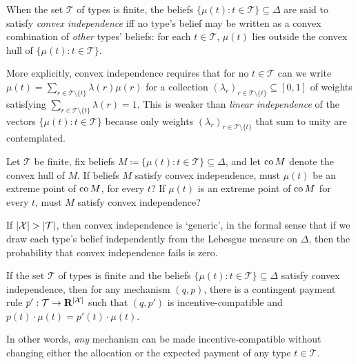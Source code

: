 \begin{definition}
	\label{definition:convex_indep}
	When the set $\mathcal{T}$ of types is finite,
	the beliefs $\{ \mu(t) : t \in \mathcal{T} \} \subseteq \Delta$
	are said to satisfy \emph{convex independence}
	iff no type's belief may be written as a convex combination of \emph{other} types' beliefs:
	for each $t \in \mathcal{T}$, $\mu(t)$ lies outside the convex hull of $\{ \mu(t) : t \in \mathcal{T} \}$.
\end{definition}

More explicitly, convex independence requires that
for no $t \in \mathcal{T}$
can we write $\mu(t) = \sum_{r \in \mathcal{T} \setminus \{t\}} \lambda(r) \mu(r)$
for a collection $( \lambda_r )_{r \in \mathcal{T} \setminus \{t\}} \subseteq [0,1]$ of weights satisfying $\sum_{r \in \mathcal{T} \setminus \{t\}} \lambda(r) = 1$.
This is weaker than \emph{linear independence} of the vectors $\{ \mu(t) : t \in \mathcal{T} \}$ because only weights $( \lambda_r )_{r \in \mathcal{T} \setminus \{t\}}$ that sum to unity are contemplated.

\begin{exercise}
	\label{exercise:convex_indep_ext_point}
	Let $\mathcal{T}$ be finite,
	fix beliefs $M \coloneqq \{ \mu(t) : t \in \mathcal{T} \} \subseteq \Delta$,
	and let $\operatorname*{co} M$ denote the convex hull of $M$.
	If beliefs $M$ satisfy convex independence, must $\mu(t)$ be an extreme point of $\operatorname*{co} M$, for every $t$?
	If $\mu(t)$ is an extreme point of $\operatorname*{co} M$ for every $t$, must $M$ satisfy convex independence?
\end{exercise}

If $\abs*{\mathcal{X}} > \abs*{\mathcal{T}}$, then convex independence is `generic', in the formal sense that if we draw each type's belief independently from the Lebesgue measure on $\Delta$, then the probability that convex independence fails is zero.


\begin{theorem}
	\label{theorem:CremerMclean}
	If the set $\mathcal{T}$ of types is finite
	and the beliefs $\{ \mu(t) : t \in \mathcal{T} \} \subseteq \Delta$
	satisfy convex independence,
	then for any mechanism $(q,p)$,
	there is a contingent payment rule $p' : \mathcal{T} \to \R^{\abs*{\mathcal{X}}}$
	such that $(q,p')$ is incentive-compatible
	and $p(t) \cdot \mu(t) = p'(t) \cdot \mu(t)$.
\end{theorem}

In other words, \emph{any} mechanism can be made incentive-compatible
without changing either the allocation or the expected payment of any type $t \in \mathcal{T}$.

